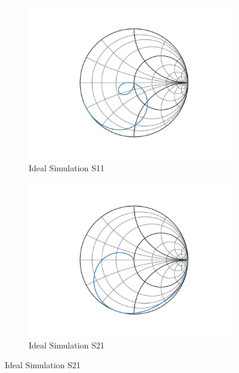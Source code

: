 \documentclass[letterpaper,12pt]{article}
\begin{document}
\begin{figure}[H]
    \begin{subfigure}[t]{.49\textwidth}
      \centering
      \includegraphics[width=\linewidth]{figures/8.s11.ideal}
      \caption{Ideal Simulation S11}
    \end{subfigure}
    \hfill
    \begin{subfigure}[t]{.49\textwidth}
      \centering
      \includegraphics[width=\linewidth]{figures/8.s21.ideal}
      \caption{Ideal Simulation S21}
    \end{subfigure}

    \medskip
    

\end{figure}
\end{document}
